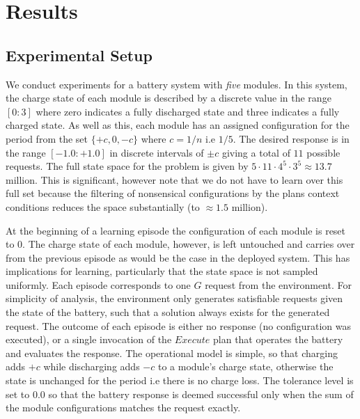\section{Results}\label{sec:results}

\subsection{Experimental Setup}\label{subsec:setup}

We conduct experiments for a battery system with {\em five} modules. In this system, the charge state of each module is described by a discrete value in the range $[0:3]$ where zero indicates a fully discharged state and three indicates a fully charged state. As well as this, each module has an assigned configuration for the period from the set $\{+c, 0, -c\}$ where $c=1/n$ i.e $1/5$. The desired response is in the range $[-1.0:+1.0]$ in discrete intervals of $\pm c$ giving a total of $11$ possible requests. The full state space for the problem is given by $5 \cdot 11 \cdot 4^5 \cdot 3^5 \approx 13.7$ million. This is significant, however note that we do not have to learn over this full set because the filtering of nonsensical configurations by the plans context conditions reduces the space substantially (to $\approx 1.5$ million).

At the beginning of a learning episode the configuration of each module is reset to $0$. The charge state of each module, however, is left untouched and carries over from the previous episode as would be the case in the deployed system. This has implications for learning, particularly that the state space is not sampled uniformly. Each episode corresponds to one $G$ request from the environment. For simplicity of analysis, the environment only generates satisfiable requests given the state of the battery, such that a solution always exists for the generated request. The outcome of each episode is either no response (no configuration was executed), or a single invocation of the $Execute$ plan that operates the battery and evaluates the response. The operational model is simple, so that charging adds $+c$ while discharging adds $-c$ to a module's charge state, otherwise the state is unchanged for the period i.e there is no charge loss. The tolerance level is set to $0.0$ so that the battery response is deemed successful only when the sum of the module configurations matches the request exactly.

